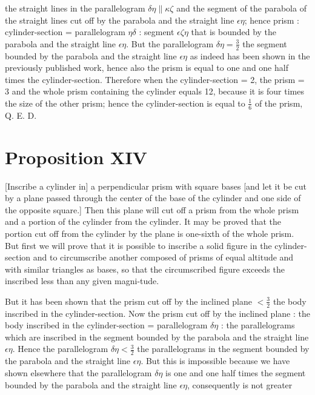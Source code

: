 \documentclass[12pt]{article}
\begin{document}
the straight lines in the parallelogram $\delta\eta \| \kappa\zeta$
and the segment of the parabola of the straight lines cut off by the
parabola and the straight line $\epsilon\eta$; hence prism :
cylinder-section = parallelogram $\eta\delta$ : segment
$\epsilon\zeta\eta$ that is bounded by the parabola and the straight
line $\epsilon\eta$.  But the parallelogram $\delta\eta = \frac{3}{2}$
the segment bounded by the parabola and the straight line
$\epsilon\eta$ as indeed has been shown in the previously published
work, hence also the prism is equal to one and one half times the
cylinder-section. Therefore when the cylinder-section = 2, the prism =
3 and the whole prism containing the cylinder equals 12, because it is
four times the size of the other prism; hence the cylinder-section is
equal to $\frac{1}{6}$ of the prism, Q. E. D.


\section*{Proposition XIV}

[Inscribe a cylinder in] a perpendicular prism with square bases [and
let it be cut by a plane passed through the center of the base of the
cylinder and one side of the opposite square.] Then this plane will
cut off a prism from the whole prism and a portion of the cylinder
from the cylinder. It may be proved that the portion cut off from the
cylinder by the plane is one-sixth of the whole prism. But first we
will prove that it is possible to inscribe a solid figure in the
cylinder-section and to circumscribe another composed of prisms of
equal altitude and with similar triangles as bases, so that the
circumscribed figure exceeds the inscribed less than any given
magni-\-\linebreak tude.\dotfill

But it has been shown that the prism cut off by the inclined plane
$<\frac{3}{2}$ the body inscribed in the cylinder-section. Now the
prism cut off by the inclined plane : the body inscribed in the
cylinder-section = parallelogram $\delta\eta$ : the parallelograms
which are inscribed in the segment bounded by the parabola and the
straight line $\epsilon\eta$. Hence the parallelogram $\delta\eta
<\frac{3}{2}$ the parallelograms in the segment bounded by the
parabola and the straight line $\epsilon\eta$. But this is impossible
because we have shown elsewhere that the parallelogram $\delta\eta$ is
one and one half times the segment bounded by the parabola and the
straight line $\epsilon\eta$, consequently is \dotfill not greater
\dotfill
\end{document}

